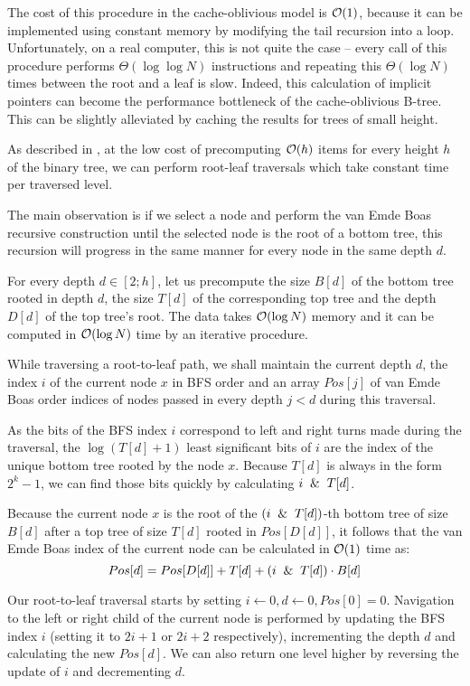 The cost of this procedure in the cache-oblivious model is $\mathcal{O}(1)$, because
it can be implemented using constant memory by modifying the tail recursion into
a loop. Unfortunately, on a real computer, this is not quite the case --
every call of this procedure performs $\Theta(\log\log N)$ instructions and
repeating this $\Theta(\log N)$ times between the root and a leaf is slow.
Indeed, this calculation of implicit pointers can become the performance
bottleneck of the cache-oblivious B-tree.
This can be slightly alleviated by caching the results for trees of small
height.

As described in \cite{brodal01}, at the low cost of precomputing $\mathcal{O}(h)$
items for every height $h$ of the binary tree, we can perform root-leaf
traversals which take constant time per traversed level.

The main observation is if we select a node and perform the van Emde Boas
recursive construction until the selected node is the root of a bottom tree,
this recursion will progress in the same manner for every node in the same
depth $d$.

For every depth $d\in[2;h]$, let us precompute the size $B[d]$ of
the bottom tree rooted in depth $d$, the size $T[d]$ of the corresponding
top tree and the depth $D[d]$ of the top tree's root. The data takes $\mathcal{O}(\log
N)$ memory and it can be computed in $\mathcal{O}(\log N)$ time by an iterative procedure.

While traversing a root-to-leaf path, we shall maintain the current depth
$d$, the index $i$ of the current node $x$ in BFS order and an array
$Pos[j]$ of van Emde Boas order indices of nodes passed in every depth $j<d$
during this traversal.

As the bits of the BFS index $i$ correspond to left and right turns made during
the traversal, the $\log(T[d]+1)$ least significant bits of $i$ are the
index of the unique bottom tree rooted by the node $x$. Because $T[d]$ is
always in the form $2^k-1$, we can find those bits quickly by calculating
$i \And T[d]$.

Because the current node $x$ is the root of the $(i \And T[d])$-th
bottom tree of size $B[d]$ after a top tree of size $T[d]$ rooted in
$Pos[D[d]]$, it follows that the van Emde Boas index of the current node can be
calculated in $\mathcal{O}(1)$ time as:
$$Pos[d]=Pos[D[d]] + T[d] + (i \And T[d]) \cdot B[d]$$

Our root-to-leaf traversal starts by setting $i\gets 0, d\gets 0, Pos[0]=0$.
Navigation to the left or right child of the current node is performed
by updating the BFS index $i$ (setting it to $2i+1$ or $2i+2$ respectively),
incrementing the depth $d$ and calculating the new $Pos[d]$.
We can also return one level higher by reversing the update of $i$ and
decrementing $d$.

